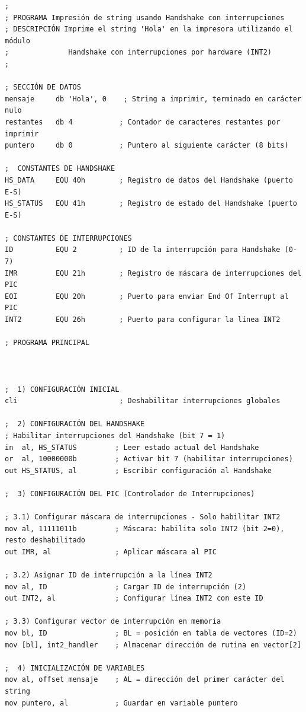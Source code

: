 \documentclass[12pt,oneside]{templates/unerthesis}
\begin{document}
\begin{lstlisting}
; 
; PROGRAMA Impresión de string usando Handshake con interrupciones
; DESCRIPCIÓN Imprime el string 'Hola' en la impresora utilizando el módulo
;              Handshake con interrupciones por hardware (INT2)
; 

; SECCIÓN DE DATOS 
mensaje     db 'Hola', 0    ; String a imprimir, terminado en carácter nulo
restantes   db 4           ; Contador de caracteres restantes por imprimir
puntero     db 0           ; Puntero al siguiente carácter (8 bits)

;  CONSTANTES DE HANDSHAKE 
HS_DATA     EQU 40h        ; Registro de datos del Handshake (puerto E-S)
HS_STATUS   EQU 41h        ; Registro de estado del Handshake (puerto E-S)

; CONSTANTES DE INTERRUPCIONES 
ID          EQU 2          ; ID de la interrupción para Handshake (0-7)
IMR         EQU 21h        ; Registro de máscara de interrupciones del PIC
EOI         EQU 20h        ; Puerto para enviar End Of Interrupt al PIC
INT2        EQU 26h        ; Puerto para configurar la línea INT2

; PROGRAMA PRINCIPAL



;  1) CONFIGURACIÓN INICIAL 
cli                        ; Deshabilitar interrupciones globales

;  2) CONFIGURACIÓN DEL HANDSHAKE
; Habilitar interrupciones del Handshake (bit 7 = 1)
in  al, HS_STATUS         ; Leer estado actual del Handshake
or  al, 10000000b         ; Activar bit 7 (habilitar interrupciones)
out HS_STATUS, al         ; Escribir configuración al Handshake

;  3) CONFIGURACIÓN DEL PIC (Controlador de Interrupciones)

; 3.1) Configurar máscara de interrupciones - Solo habilitar INT2
mov al, 11111011b         ; Máscara: habilita solo INT2 (bit 2=0), resto deshabilitado
out IMR, al               ; Aplicar máscara al PIC

; 3.2) Asignar ID de interrupción a la línea INT2
mov al, ID                ; Cargar ID de interrupción (2)
out INT2, al              ; Configurar línea INT2 con este ID

; 3.3) Configurar vector de interrupción en memoria
mov bl, ID                ; BL = posición en tabla de vectores (ID=2)
mov [bl], int2_handler    ; Almacenar dirección de rutina en vector[2]

;  4) INICIALIZACIÓN DE VARIABLES 
mov al, offset mensaje    ; AL = dirección del primer carácter del string
mov puntero, al           ; Guardar en variable puntero


\end{lstlisting}
\end{document}
